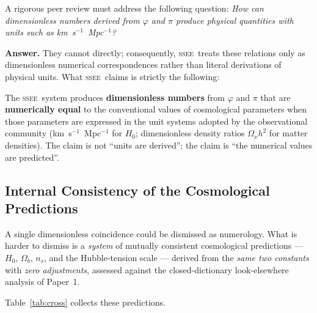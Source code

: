 \documentclass[12pt,a4paper]{article}
\newcommand{\SSEE}{\ifmmode\mathrm{SSEE}\else\textsc{ssee}\fi}
\begin{document}
A rigorous peer review must address the following question:
\emph{How can dimensionless numbers derived from $\varphi$ and $\pi$ produce
physical quantities with units such as km~s$^{-1}$~Mpc$^{-1}$?}

\textbf{Answer.}
They cannot directly; consequently, \SSEE\ treats these relations only as dimensionless numerical correspondences rather than literal derivations of physical units.
What \SSEE\ claims is strictly the following:

\begin{tcolorbox}[colback=blue!5,colframe=blue!50,title=Scope of SSEE Predictions]
The \SSEE\ system produces \textbf{dimensionless numbers} from $\varphi$ and
$\pi$ that are \textbf{numerically equal} to the conventional values of
cosmological parameters when those parameters are expressed in the unit
systems adopted by the observational community
(km~s$^{-1}$~Mpc$^{-1}$ for $H_0$; dimensionless density ratios $\Omega_x h^2$
for matter densities).
The claim is not ``units are derived''; the claim is
``the numerical values are predicted''.
\end{tcolorbox}

\subsection{Internal Consistency of the Cosmological Predictions}
\label{sec:numerology}

A single dimensionless coincidence could be dismissed as numerology.
What is harder to dismiss is a \emph{system} of mutually consistent
cosmological predictions --- $H_0$, $\Omega_b$, $n_s$, and the
Hubble-tension scale --- derived from the \emph{same two constants}
with \emph{zero adjustments}, assessed against the closed-dictionary
look-elsewhere analysis of Paper~1.

Table~\ref{tab:cross} collects these predictions.
\end{document}
